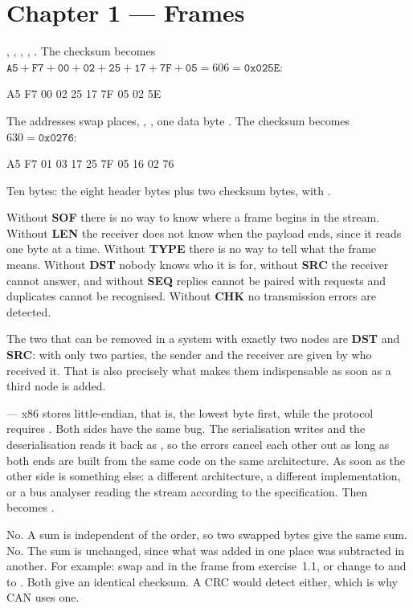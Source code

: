 \section*{Chapter 1 --- Frames}

 , , , ,
. The checksum becomes
$\mathtt{A5}+\mathtt{F7}+\mathtt{00}+\mathtt{02}+\mathtt{25}+\mathtt{17}+\mathtt{7F}+\mathtt{05}
= 606 = \mathtt{0x025E}$:

\begin{console}
A5 F7 00 02 25 17 7F 05 02 5E
\end{console}

 The addresses swap places, , , one data byte .
The checksum becomes $630 = \mathtt{0x0276}$:

\begin{console}
A5 F7 01 03 17 25 7F 05 16 02 76
\end{console}

 Ten bytes: the eight header bytes plus two checksum bytes, with .

Without \textbf{SOF} there is no way to know where a frame begins in the stream. Without
\textbf{LEN} the receiver does not know when the payload ends, since it reads one byte at a time.
Without \textbf{TYPE} there is no way to tell what the frame means. Without \textbf{DST} nobody
knows who it is for, without \textbf{SRC} the receiver cannot answer, and without \textbf{SEQ}
replies cannot be paired with requests and duplicates cannot be recognised. Without \textbf{CHK}
no transmission errors are detected.

The two that can be removed in a system with exactly two nodes are \textbf{DST} and \textbf{SRC}:
with only two parties, the sender and the receiver are given by who received it. That is also
precisely what makes them indispensable as soon as a third node is added.

  --- x86 stores little-endian, that is, the lowest byte first, while the
protocol requires .
 Both sides have the same bug. The serialisation writes  and the
deserialisation reads it back as , so the errors cancel each other out as long as
both ends are built from the same code on the same architecture.
 As soon as the other side is something else: a different architecture, a different
implementation, or a bus analyser reading the stream according to the specification. Then
 becomes .

 No. A sum is independent of the order, so two swapped bytes give the same sum.
 No. The sum is unchanged, since what was added in one place was subtracted in another.
 For example: swap  and  in the frame from exercise~1.1, or change
 to  and  to . Both give an identical checksum. A CRC
would detect either, which is why CAN uses one.
